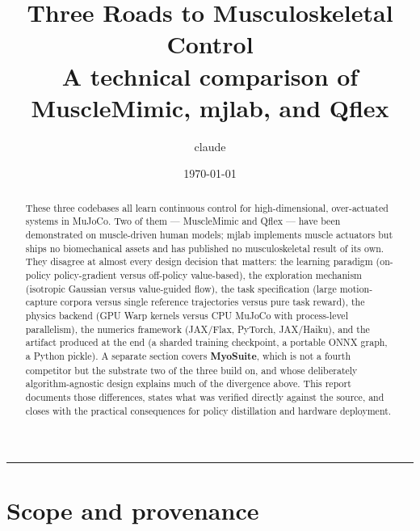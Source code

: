 \documentclass[11pt,a4paper]{article}
\begin{document}
\title{\vspace{-1.5cm}\textbf{Three Roads to Musculoskeletal Control}\\[0.3em]
\large A technical comparison of MuscleMimic, mjlab, and Qflex}
\author{claude}
\date{\today}
\maketitle
\vspace{-1cm}

\begin{abstract}
\noindent
These three codebases all learn continuous control for high-dimensional, over-actuated
systems in MuJoCo. Two of them --- MuscleMimic and Qflex --- have been demonstrated on
muscle-driven human models; mjlab implements muscle actuators but ships no biomechanical
assets and has published no musculoskeletal result of its own.
They disagree at almost every design decision that matters: the learning
paradigm (on-policy policy-gradient versus off-policy value-based), the exploration
mechanism (isotropic Gaussian versus value-guided flow), the task specification
(large motion-capture corpora versus single reference trajectories versus pure task
reward), the physics backend (GPU Warp kernels versus CPU MuJoCo with process-level
parallelism), the numerics framework (JAX/Flax, PyTorch, JAX/Haiku), and the artifact
produced at the end (a sharded training checkpoint, a portable ONNX graph, a Python
pickle). A separate section covers \textbf{MyoSuite}, which is not a fourth competitor but
the substrate two of the three build on, and whose deliberately algorithm-agnostic design
explains much of the divergence above. This report documents those differences, states what
was verified directly against the source, and closes with the practical consequences for
policy distillation and hardware deployment.
\end{abstract}

\tableofcontents
\vspace{0.6em}
\hrule
\vspace{0.8em}

\section{Scope and provenance}
\end{document}
